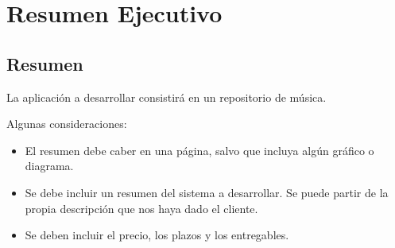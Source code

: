 
\chapter{Resumen Ejecutivo} %

\label{Chapter1} %


\section{Resumen}

La aplicación a desarrollar consistirá en un repositorio de música. 

Algunas consideraciones:
\begin{itemize}
	\item El resumen debe caber en una página, salvo que incluya algún gráfico o diagrama.
	\item Se debe incluir un resumen del sistema a desarrollar. Se puede partir de la propia descripción que nos haya dado el cliente.
	\item Se deben incluir el precio, los plazos y los entregables.
\end{itemize}
